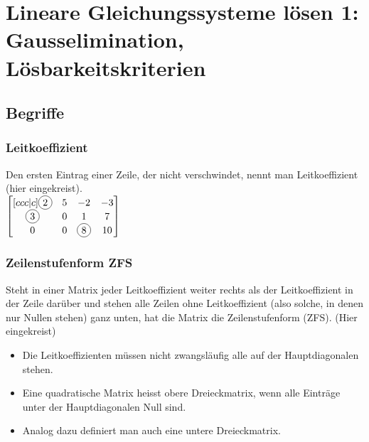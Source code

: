 \documentclass[../main.tex]{subfiles}
\begin{document}

\chapter{Lineare Gleichungssysteme lösen 1: Gausselimination, Lösbarkeitskriterien}

\section{Begriffe}
\subsection{Leitkoeffizient}
Den ersten Eintrag einer Zeile, der nicht verschwindet, nennt man Leitkoeffizient (hier eingekreist). \\

$\begin{bmatrix}[ccc|c]
    \circled{2} & 5 & -2 & -3 \\
    \circled{3} & 0 & 1 &  7 \\
    0 & 0 & \circled{8} &  10 \\
\end{bmatrix}$

\subsection{Zeilenstufenform ZFS}
Steht in einer Matrix jeder Leitkoeffizient weiter rechts als der Leitkoeffizient in der Zeile darüber
und stehen alle Zeilen ohne Leitkoeffizient (also solche, in denen nur Nullen stehen) ganz unten,
hat die Matrix die Zeilenstufenform (ZFS). (Hier eingekreist)
\begin{itemize}
    \item Die Leitkoeffizienten müssen nicht zwangsläufig alle auf der Hauptdiagonalen stehen.
    \item Eine quadratische Matrix heisst obere Dreieckmatrix, wenn alle Einträge unter der Hauptdiagonalen Null sind. 
    \item Analog dazu definiert man auch eine untere Dreieckmatrix.
\end{itemize}
\end{document}
